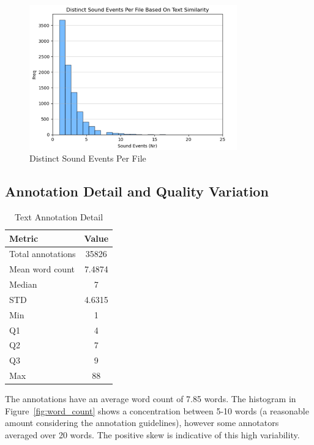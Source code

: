 \documentclass{article}
\begin{document}
\begin{figure}[ht]
  \centering
  \includegraphics[width=0.8\textwidth]{figures/annotation_quality/distinct_sound_events_per_file.png}
  \caption{Distinct Sound Events Per File}
  \label{fig:events_per_file}
\end{figure}

\subsection{Annotation Detail and Quality Variation}

\begin{table}[ht]
  \caption{Text Annotation Detail}
  \label{tab:text_detail}
  \centering
  \begin{tabular}{lc}
    \toprule
    Metric & Value \\
    \midrule
    Total annotations & 35826 \\
    Mean word count & 7.4874 \\
    Median & 7 \\
    STD & 4.6315 \\
    Min & 1 \\
    Q1 & 4 \\
    Q2 & 7 \\
    Q3 & 9 \\
    Max & 88 \\
    \bottomrule
  \end{tabular}
\end{table}

The annotations have an average word count of 7.85 words. The histogram in Figure~\ref{fig:word_count} shows a concentration between 5-10 words (a reasonable amount considering the annotation guidelines), however some annotators averaged over 20 words. The positive skew is indicative of this high variability.
\end{document}
